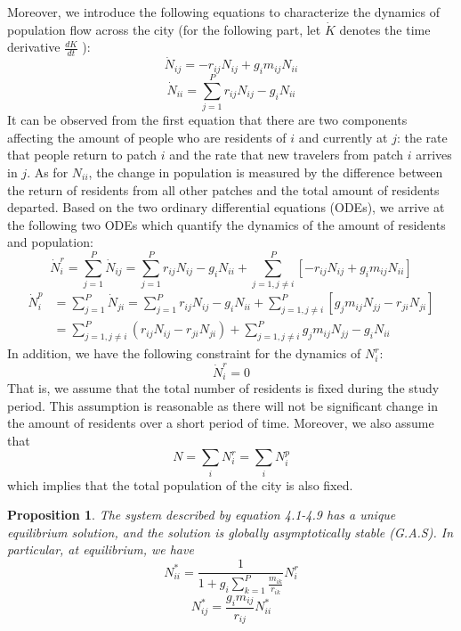 \documentclass[review]{elsarticle}
\theoremstyle{plain}
\newtheorem{proposition}[theorem]{Proposition}
\theoremstyle{definition}
\theoremstyle{remark}
\numberwithin{equation}{section}
\theoremstyle{remark}
\begin{document}
 
Moreover, we introduce the following equations to characterize the dynamics of population flow across the city (for the following part, let $\dot{K}$ denotes the time derivative $\frac{dK}{dt}$ ):
\begin{equation}
\dot{N}_{ij}=-r_{ij}N_{ij}+g_im_{ij}N_{ii}
\end{equation}
\begin{equation}
\dot{N}_{ii}=\sum_{j=1}^P r_{ij}N_{ij}-g_iN_{ii}
\end{equation}
It can be observed from the first equation that there are two components affecting the amount of people who are residents of $i$ and currently at $j$: the rate that people return to patch $i$ and the rate that new travelers from patch $i$ arrives in $j$. As for $N_{ii}$, the change in population is measured by the difference between the return of residents from all other patches and the total amount of residents departed. Based on the two ordinary differential equations (ODEs), we arrive at the following two ODEs which quantify the dynamics of the amount of residents and population:
\begin{equation}
\dot{N}_i^r=\sum_{j=1}^P \dot{N}_{ij}=\sum_{j=1}^P r_{ij}N_{ij}-g_iN_{ii}+\sum_{j=1,j\neq i}^P [-r_{ij}N_{ij}+g_im_{ij}N_{ii}] 
\end{equation} 
\begin{eqnarray}
\dot{N}_i^p &=\sum_{j=1}^P \dot{N}_{ji}=\sum_{j=1}^P r_{ij}N_{ij}-g_iN_{ii}+\sum_{j=1,j\neq i}^P[g_jm_{ij}N_{jj}-r_{ji}N_{ji}]\\
&= \sum_{j=1,j\neq i}^P (r_{ij}N_{ij}-r_{ji}N_{ji})+\sum_{j=1,j\neq i}^Pg_jm_{ij}N_{jj}-g_i N_{ii}
\end{eqnarray}
In addition, we have the following constraint for the dynamics of $N_i^r$:
\begin{equation}
\dot{N}_i^r=0
\end{equation}
That is, we assume that the total number of residents is fixed during the study period. This assumption is reasonable as there will not be significant change in the amount of residents over a short period of time. Moreover, we also assume that 
\begin{equation}
N=\sum_i N_i^r=\sum_i N_i^p
\end{equation} 
which implies that the total population of the city is also fixed. 
\begin{proposition}
	The system described by equation 4.1-4.9 has a unique equilibrium solution, and the solution is globally asymptotically stable (G.A.S). In particular, at equilibrium, we have
	\begin{equation}
	N_{ii}^*=\frac{1}{1+g_i\sum_{k=1}^P\frac{m_{ik}}{r_{ik}}}N_i^r
	\end{equation}
	\begin{equation}
	N_{ij}^*=\frac{g_im_{ij}}{r_{ij}}N_{ii}^*
	\end{equation}
\end{proposition}
\end{document}
